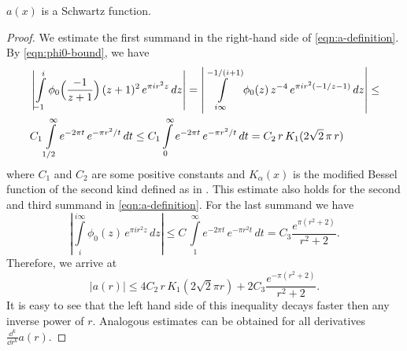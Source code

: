 \begin{proposition}\label{prop:a-schwartz}
$a(x)$ is a Schwartz function.
\end{proposition}
\begin{proof}
We estimate the first summand in the right-hand side of \eqref{eqn:a-definition}.
By \eqref{eqn:phi0-bound}, we have
\begin{align}
    &\left|\int\limits_{-1}^{i}\phi_0\Big(\frac{-1}{z+1}\Big)\,(z+1)^2\,e^{\pi i r^2 z}\,dz\right|=\left|\int\limits_{i\infty}^{-1/(i+1)}\phi_0(z)\,z^{-4}\,e^{\pi i r^2 (-1/z-1)}\,dz\right|\leq \notag\\
    &C_1\int\limits_{1/2}^{\infty}e^{-2\pi t}\,e^{-\pi    r^2/t}\,dt\leq C_1\int\limits_{0}^{\infty}e^{-2\pi t}\,e^{-\pi    r^2/t}\,dt=C_2\,r\,K_1(2\sqrt{2}\,\pi\,r)\notag
\end{align}
where $C_1$ and $C_2$ are some positive constants and $K_\alpha(x)$ is the modified Bessel function of the second kind defined as in \cite[Section~9.6]{Abramowitz}. This estimate also holds for the second and third summand in \eqref{eqn:a-definition}.
For the last summand we have
\begin{equation}
\left|\int\limits_{i}^{i\infty}\phi_0(z)\,e^{\pi i r^2 z}\,dz\right|\leq C\,\int\limits_{1}^{\infty} e^{-2\pi t}\,e^{-\pi r^2 t}\,dt=C_3\frac{e^{\pi(r^2+2)}}{r^2+2}.
\end{equation}
Therefore, we arrive at
\begin{equation}
    |a(r)|\leq 4C_2\,r\,K_1(2\sqrt{2}\pi r)+2C_3\frac{e^{-\pi(r^2+2)}}{r^2+2}.
\end{equation}
It is easy to see that the left hand side of this inequality decays faster then any inverse power of $r$. Analogous estimates can be obtained for all derivatives $\frac{\dd^k}{\dd r^k}a(r)$.
\end{proof}

